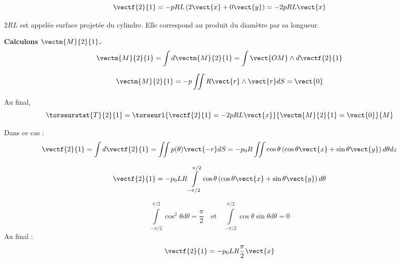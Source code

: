 $$
\vectf{2}{1}
= -p R L \left(2\vect{x}
+0\vect{y}
\right) = -2pRL\vect{x}
$$

$2RL$ est appelée surface projetée du cylindre. Elle correspond au produit du diamètre par sa longueur.

\vspace{.5cm}

\textbf{Calculons $\vectm{M}{2}{1}$.}
$$
\vectm{M}{2}{1} = \int d\vectm{M}{2}{1}= \int \vect{OM}\wedge d\vectf{2}{1}
$$

$$
\vectm{M}{2}{1} = -p \iint R\vect{r} \wedge \vect{r}dS = \vect{0}
$$

Au final, 
$$
\torseurstat{T}{2}{1} = \torseurl{\vectf{2}{1} = -2pRL\vect{x}}{\vectm{M}{2}{1} =  \vect{0}}{M}
$$

\else
\fi





\ifprof
Dans ce cas : 
$$
\vectf{2}{1} = \int d\vectf{2}{1} = \iint p(\theta) \vect{-r} dS 
= - p_0R\iint\cos\theta  \left(\cos\theta\vect{x}+\sin\theta\vect{y} \right)  d\theta dz$$

$$
\vectf{2}{1} 
= - p_0 L R\int\limits_{-\pi/2}^{\pi/2}\cos\theta  \left(\cos\theta\vect{x}+\sin\theta\vect{y} \right)  d\theta$$

$$
\int\limits_{-\pi/2}^{\pi/2}\cos^2\theta  d\theta = \dfrac{\pi}{2}
\quad 
\text{et}
\quad
\int\limits_{-\pi/2}^{\pi/2}\cos\theta \sin\theta  d\theta = 0
$$
Au final :
$$
\vectf{2}{1} 
= - p_0 L R \dfrac{\pi}{2}\vect{x}$$
\else
\fi



\ifprof
\else


\fi

